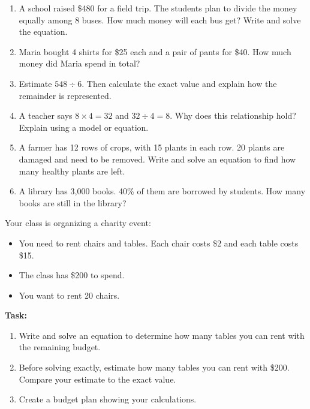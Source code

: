 \documentclass[12pt]{article}
\begin{document}
\begin{tcolorbox}[colframe=black!60, colback=white, 
coltitle=black, colbacktitle=black!15, fonttitle=\bfseries\Large, 
title=Problems, halign title=center, left=10pt, right=10pt, top=10pt, bottom=80pt]
\begin{enumerate}[start=9, itemsep=5em]
    \item A school raised \$480 for a field trip. The students plan to divide the money equally among 8 buses. How much money will each bus get? Write and solve the equation.
    \item Maria bought 4 shirts for \$25 each and a pair of pants for \$40. How much money did Maria spend in total?
    \item Estimate \( 548 \div 6 \). Then calculate the exact value and explain how the remainder is represented.
    \item A teacher says \( 8 \times 4 = 32 \) and \( 32 \div 4 = 8 \). Why does this relationship hold? Explain using a model or equation.
    \item A farmer has 12 rows of crops, with 15 plants in each row. 20 plants are damaged and need to be removed. Write and solve an equation to find how many healthy plants are left.
    \item A library has 3,000 books. 40\% of them are borrowed by students. How many books are still in the library?
\end{enumerate}
\end{tcolorbox}

\vspace{1em}

\begin{tcolorbox}[colframe=black!60, colback=white, 
coltitle=black, colbacktitle=black!15, fonttitle=\bfseries\Large, 
title=Performance Task: Organizing a Charity Event, halign title=center, left=10pt, right=10pt, top=10pt, bottom=50pt]
Your class is organizing a charity event:
\begin{itemize}
    \item You need to rent chairs and tables. Each chair costs \$2 and each table costs \$15.
    \item The class has \$200 to spend.
    \item You want to rent 20 chairs.
\end{itemize}
\textbf{Task:}
\begin{enumerate}[itemsep=3em]
    \item Write and solve an equation to determine how many tables you can rent with the remaining budget.
    \item Before solving exactly, estimate how many tables you can rent with \$200. Compare your estimate to the exact value.
    \item Create a budget plan showing your calculations.
\end{enumerate}
\end{tcolorbox}
\end{document}
